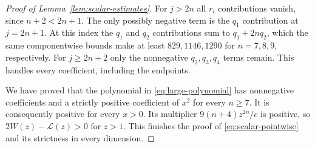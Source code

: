 \begin{proof}[Proof of Lemma~\ref{lem:scalar-estimates}]
For $j>2n$ all $r_i$ contributions vanish, since $n+2<2n+1$.
The only possibly negative term is the $q_1$ contribution at
$j=2n+1$.  At this index the $q_1$ and $q_2$ contributions sum to
$q_1+2nq_2$, which the same componentwise bounds make at least
$829,1146,1290$ for $n=7,8,9$, respectively.  For $j\ge2n+2$ only
the nonnegative $q_2,q_3,q_4$ terms remain.  This handles every
coefficient, including the endpoints.

We have proved that the polynomial in \eqref{eq:large-polynomial}
has nonnegative coefficients and a strictly positive coefficient of
$x^2$ for every $n\ge7$.  It is consequently positive for every
$x>0$.  Its multiplier $9(n+4)z^{2n}/c$ is positive, so
$2W(z)-\mathcal L(z)>0$ for $z>1$.  This finishes the proof of
\eqref{eq:scalar-pointwise} and its strictness in every dimension.
\end{proof}

